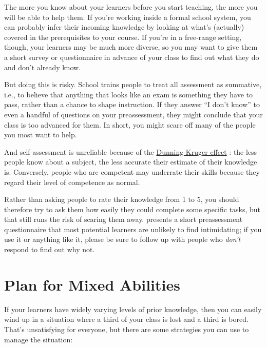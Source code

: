 The more you know about your learners before you start teaching, the
more you will be able to help them.  If you're working inside a formal
school system, you can probably infer their incoming knowledge by
looking at what's (actually) covered in the prerequisites to your
course.  If you're in a free-range setting, though, your learners may
be much more diverse, so you may want to give them a short survey or
questionnaire in advance of your class to find out what they do and
don't already know.

But doing this is risky.  School trains people to treat all assessment
as summative, i.e., to believe that anything that looks like an exam
is something they have to pass, rather than a chance to shape
instruction.  If they answer ``I don't know'' to even a handful of
questions on your preassessment, they might conclude that your class
is too advanced for them.  In short, you might scare off many of the
people you most want to help.

And self-assessment is unreliable because of the
\href{https://en.wikipedia.org/wiki/Dunning\%E2\%80\%93Kruger_effect}{Dunning-Kruger
  effect} \cite{Krug1999}: the less people know about a subject, the
less accurate their estimate of their knowledge is.  Conversely,
people who are competent may underrate their skills because they
regard their level of competence as normal.

Rather than asking people to rate their knowledge from 1 to 5, you
should therefore try to ask them how easily they could complete some
specific tasks, but that still runs the risk of scaring them away.
 presents a short preassessment questionnaire
that most potential learners are unlikely to find intimidating; if you
use it or anything like it, please be sure to follow up with people
who \emph{don't} respond to find out why not.

\section{Plan for Mixed Abilities}\label{s:classroom-mixed}

If your learners have widely varying levels of prior knowledge, then
you can easily wind up in a situation where a third of your class is
lost and a third is bored.  That's unsatisfying for everyone, but
there are some strategies you can use to manage the situation:

